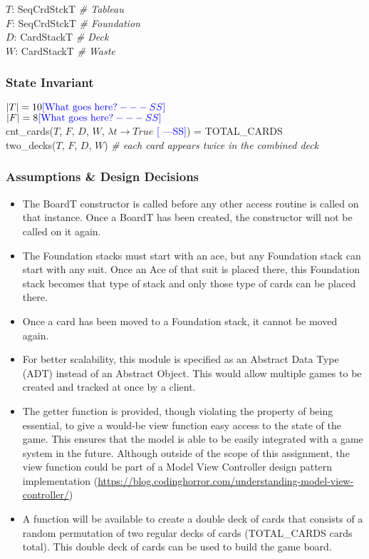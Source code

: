\documentclass[12pt]{article}
\newcommand{\authornote}[3]{\textcolor{#1}{[#3 ---#2]}}
\newcommand{\authornote}[3]{}
\newcommand{\wss}[1]{\authornote{blue}{SS}{#1}}
\begin{document}
$T$: SeqCrdStckT \textit{\# Tableau}\\
$F$: SeqCrdStckT \textit{\# Foundation}\\
$D$: CardStackT \textit{\# Deck}\\
$W$: CardStackT \textit{\# Waste}\\

\subsubsection* {State Invariant}

$|T| =10 \wss{\text{What goes here?}}$\\
$|F| = 8\wss{\text{What goes here?}}$\\
cnt\_cards($T$, $F$, $D$, $W$, $\lambda t \rightarrow True$ \wss{}) = TOTAL\_CARDS\\
two\_decks($T$, $F$, $D$, $W$) \textit{\# each card appears twice in the combined deck}

\subsubsection* {Assumptions \& Design Decisions}

\begin{itemize}

\item The BoardT constructor is called before any other access
  routine is called on that instance. Once a BoardT has been created, the
  constructor will not be called on it again.

\item The Foundation stacks must start with an ace, but any Foundation stack can
  start with any suit. Once an Ace of that suit is placed there, this Foundation
  stack becomes that type of stack and only those type of cards can be placed
  there.

\item Once a card has been moved to a Foundation stack, it cannot be moved again.

\item For better scalability, this module is specified as an Abstract Data Type
  (ADT) instead of an Abstract Object. This would allow multiple games to be
  created and tracked at once by a client.

\item The getter function is provided, though violating the property of being
  essential, to give a would-be view function easy access to the state of the
  game. This ensures that the model is able to be easily integrated with a game
  system in the future.  Although outside of the scope of this assignment, the
  view function could be part of a Model View Controller design pattern implementation
  (\url{https://blog.codinghorror.com/understanding-model-view-controller/})

\item A function will be available to create a double deck of cards that
  consists of a random permutation of two regular decks of cards (TOTAL\_CARDS
  cards total).  This double deck of cards can be used to build the game board.

\end{itemize}
\end{document}
